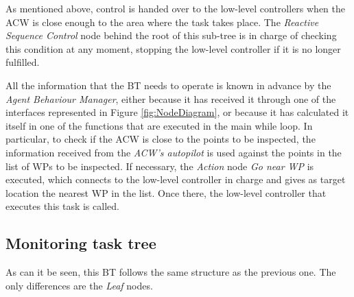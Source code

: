 As mentioned above, control is handed over to the low-level controllers when the \gls{ACW} is close enough to the area where the task takes place. The \emph{Reactive Sequence Control} node behind the root of this sub-tree is in charge of checking this condition at any moment, stopping the low-level controller if it is no longer fulfilled.

All the information that the \gls{BT} needs to operate is known in advance by the \emph{Agent Behaviour Manager}, either because it has received it through one of the interfaces represented in Figure \ref{fig:NodeDiagram}, or because it has calculated it itself in one of the functions that are executed in the main while loop. In particular, to check if the \gls{ACW} is close to the points to be inspected, the information received from the \emph{\gls{ACW}'s autopilot} is used against the points in the list of \glspl{WP} to be inspected. If necessary, the \emph{Action} node \emph{Go near \gls{WP}} is executed, which connects to the low-level controller in charge and gives as target location the nearest \gls{WP} in the list. Once there, the low-level controller that executes this task is called.

\subsection{Monitoring task tree}
\label{sec:MonitoringTaskTree}
As can it be seen, this \gls{BT} follows the same structure as the previous one. The only differences are the \emph{Leaf} nodes.

